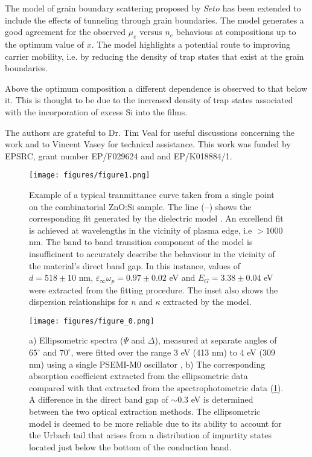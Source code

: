 \documentclass[aps,prl,preprint,showpacs,showkeys, linenumbers]{revtex4-1}
\begin{document}
The model of grain boundary scattering proposed by $Seto$ \cite{Seto1975} has been extended to include the effects of tunneling through grain boundaries. The model generates a good agreement for the observed $\mu_e$ versus $n_e$ behavious at compositions up to the optimum value of $x$. The model highlights a potential route to improving carrier mobility, i.e. by reducing the density of trap states that exist at the grain boundaries.

Above the optimum composition a different dependence is observed to that below it. This is thought to be due to the increased density of trap states associated with the incorporation of excess Si into the films.


\begin{acknowledgements}
The authors are grateful to Dr. Tim Veal for useful discussions concerning the work and to Vincent Vasey for technical assistance. This work was funded by EPSRC, grant number EP/F029624 and and EP/K018884/1.
\end{acknowledgements}




\begin{figure}[0]
\centering
\texttt{[image: figures/figure1.png]}
\caption{\label{fig:1} Example of a typical tranmittance curve taken from a single point on the combinatorial ZnO:Si sample. The line (\textcolor{red}{\textbf{--}}) shows the corresponding fit generated by the dielectric model \cite{Treharne2012}. An excellend fit is achieved at wavelengths in the vicinity of plasma edge, i.e $>1000$ nm. The band to band transition component of the model is insufficinent to accurately describe the behaviour in the vicinity of the material's direct band gap. In this instance, values of $d= 518 \pm 10$ nm, $\varepsilon_{\infty}\omega_p = 0.97 \pm 0.02$ eV and $E_{G} = 3.38 \pm 0.04$ eV were extracted from the fitting procedure. The inset also shows the dispersion relationships for $n$ and $\kappa$ extracted by the model.}
\end{figure}

\begin{figure}[p]
\centering
\texttt{[image: figures/figure\_0.png]}
\caption{\label{fig:2} a) Ellipsometric spectra ($\Psi$ and $\Delta$), measured at separate angles of $65^{\circ}$ and $70^{\circ}$, were fitted over the range 3 eV (413 nm) to 4 eV (309 nm) using a single PSEMI-M0 oscillator \cite{Paulson1998, Johs1999}, b) The corresponding absorption coefficient extracted from the ellipsometric data compared with that extracted from the spectrophotometric data (\ref{fig:1}). A difference in the direct band gap of $\sim0.3$ eV is determined between the two optical extraction methods. The ellipsometric model is deemed to be more reliable due to its ability to account for the Urbach tail that arises from a distribution of impurtity states located just below the bottom of the conduction band.}
\end{figure}
\end{document}
